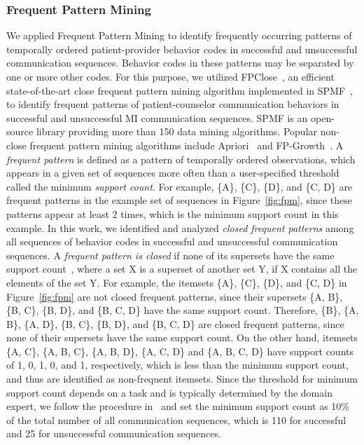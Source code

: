 \subsubsection{Frequent Pattern Mining}
\label{subsubsec:frequentPatternMining}
We applied Frequent Pattern Mining to identify frequently occurring patterns of temporally ordered patient-provider behavior codes in successful and unsuccessful communication sequences. Behavior codes in these patterns may be separated by one or more other codes. For this purpose, we utilized FPClose~\cite{grahne2005fast}, an efficient state-of-the-art close frequent pattern mining algorithm implemented in SPMF~\cite{fournier2014spmf, fournier2016spmf}, to identify frequent patterns of patient-counselor communication behaviors in successful and unsuccessful MI communication sequences. SPMF is an open-source library providing more than 150 data mining algorithms. Popular non-close frequent pattern mining algorithms include Apriori~\cite{agrawal1994fast} and FP-Growth~\cite{han2000mining}. A \textit{frequent pattern} is defined as a pattern of temporally ordered observations, which appears in a given set of sequences more often than a user-specified threshold called the minimum \textit{support count}. For example, \{A\}, \{C\}, \{D\}, and \{C, D\} are frequent patterns in the example set of sequences in Figure~\ref{fig:fpm}, since these patterns appear at least 2 times, which is the minimum support count in this example. In this work, we identified and analyzed \textit{closed frequent patterns} among all sequences of behavior codes in successful and unsuccessful communication sequences. A \textit{frequent pattern is closed} if none of its supersets have the same support count~\cite{pasquier1999discovering}, where a set X is a superset of another set Y, if X contains all the elements of the set Y. For example, the itemsets \{A\}, \{C\}, \{D\}, and \{C, D\} in Figure~\ref{fig:fpm} are not closed frequent patterns, since their supersets \{A, B\}, \{B, C\}, \{B, D\}, and \{B, C, D\} have the same support count. Therefore, \{B\}, \{A, B\}, \{A, D\}, \{B, C\}, \{B, D\}, and \{B, C, D\} are closed frequent patterns, since none of their supersets have the same support count. On the other hand, itemsets \{A, C\}, \{A, B, C\}, \{A, B, D\}, \{A, C, D\} and \{A, B, C, D\} have support counts of 1, 0, 1, 0, and 1, respectively, which is less than the minimum support count, and thus are identified as non-frequent itemsets. Since the threshold for minimum support count depends on a task and is typically determined by the domain expert, we follow the procedure in~\cite{moradi2017quantifying, liu1999mining} and set the minimum support count as 10\% of the total number of all communication sequences, which is 110 for successful and 25 for unsuccessful communication sequences. 

